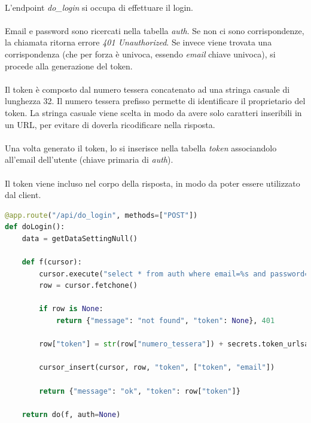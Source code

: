 \documentclass[11pt,a4paper,english]{article}
\begin{document}
\paragraph{} L'endpoint \emph{do\_login} si occupa di effettuare il login.

\paragraph{} Email e password sono ricercati nella tabella \emph{auth}. Se non ci sono corrispondenze, la chiamata ritorna errore \emph{401 Unauthorized}. Se invece viene trovata una corrispondenza (che per forza è univoca, essendo \emph{email} chiave univoca), si procede alla generazione del token.

\paragraph{} Il token è composto dal numero tessera concatenato ad una stringa casuale di lunghezza 32. Il numero tessera prefisso permette di identificare il proprietario del token. La stringa casuale viene scelta in modo da avere solo caratteri inseribili in un URL, per evitare di doverla ricodificare nella risposta. 

\paragraph{} Una volta generato il token, lo si inserisce nella tabella \emph{token} associandolo all'email dell'utente (chiave primaria di \emph{auth}). 

\paragraph{} Il token viene incluso nel corpo della risposta, in modo da poter essere utilizzato dal client. 

\begin{lstlisting}[language=Python, caption=POST do\_login]
@app.route("/api/do_login", methods=["POST"])
def doLogin():
    data = getDataSettingNull()

    def f(cursor):
        cursor.execute("select * from auth where email=%s and password=%s", (data["email"], data["password"]))
        row = cursor.fetchone()

        if row is None:
            return {"message": "not found", "token": None}, 401

        row["token"] = str(row["numero_tessera"]) + secrets.token_urlsafe(32)

        cursor_insert(cursor, row, "token", ["token", "email"])

        return {"message": "ok", "token": row["token"]}

    return do(f, auth=None)
\end{lstlisting}
\end{document}
